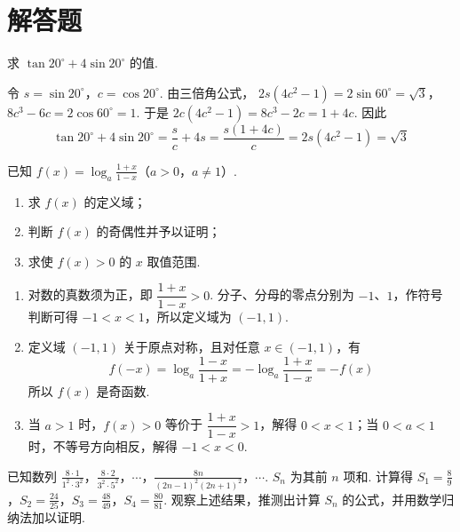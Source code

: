 \section{解答题}

\begin{problem}
求 \(\tan 20^{\circ}+4\sin 20^{\circ}\) 的值.
\end{problem}

\begin{solution}
令 \(s=\sin20^\circ\)，\(c=\cos20^\circ\). 由三倍角公式，
\(2s(4c^2-1)=2\sin60^\circ=\sqrt3\)，\(8c^3-6c=2\cos60^\circ=1\).
于是 \(2c(4c^2-1)=8c^3-2c=1+4c\). 因此
\[
\tan20^\circ+4\sin20^\circ
=\frac{s}{c}+4s
=\frac{s(1+4c)}{c}
=2s(4c^2-1)=\sqrt3
\]
\end{solution}

\begin{problem}
已知 \(f(x)=\log_a \frac{1+x}{1-x}\)（\(a>0\)，\(a\neq 1\)）.

\begin{enumerate}
\item 求 \(f(x)\) 的定义域；
\item 判断 \(f(x)\) 的奇偶性并予以证明；
\item 求使 \(f(x)>0\) 的 \(x\) 取值范围.
\end{enumerate}
\end{problem}

\begin{solution}
\begin{enumerate}
\item 对数的真数须为正，即 \(\dfrac{1+x}{1-x}>0\). 分子、分母的零点分别为 \(-1\)、\(1\)，作符号判断可得 \(-1<x<1\)，所以定义域为 \((-1,1)\).
\item 定义域 \((-1,1)\) 关于原点对称，且对任意 \(x\in(-1,1)\)，有
\[
f(-x)=\log_a\frac{1-x}{1+x}=-\log_a\frac{1+x}{1-x}=-f(x)
\]
所以 \(f(x)\) 是奇函数.
\item 当 \(a>1\) 时，\(f(x)>0\) 等价于 \(\dfrac{1+x}{1-x}>1\)，解得 \(0<x<1\)；当 \(0<a<1\) 时，不等号方向相反，解得 \(-1<x<0\).
\end{enumerate}
\end{solution}

\begin{problem}
已知数列 \(\frac{8\cdot 1}{1^2\cdot 3^2}\)，\(\frac{8\cdot 2}{3^2\cdot 5^2}\)，\(\cdots\)，\(\frac{8n}{(2n-1)^2(2n+1)^2}\)，\(\cdots\). \(S_n\) 为其前 \(n\) 项和. 计算得 \(S_1=\frac{8}{9}\)，\(S_2=\frac{24}{25}\)，\(S_3=\frac{48}{49}\)，\(S_4=\frac{80}{81}\). 观察上述结果，推测出计算 \(S_n\) 的公式，并用数学归纳法加以证明.
\end{problem}

